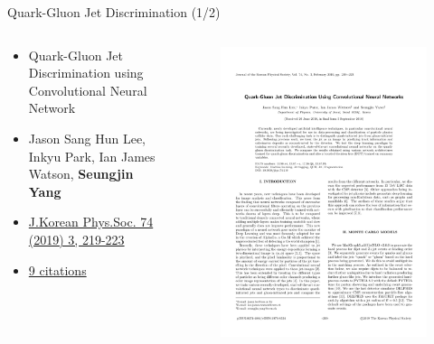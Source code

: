 \makeatletter
  \graphicspath{ {@path} }
\makeatother

\begin{frame}[fragile]{Quark-Gluon Jet Discrimination (1/2)}
  \begin{columns}
    \begin{column}{0.6\textwidth}
      \begin{itemize}
        \item Quark-Gluon Jet Discrimination using Convolutional Neural Network
        \item Jason Sang Hun Lee, Inkyu Park, Ian James Watson, {\bf Seungjin Yang}
        \item \href{https://doi.org/10.3938/jkps.74.219}{J.Korean Phys.Soc. 74 (2019) 3, 219-223}
        \item \href{https://inspirehep.net/literature/1721034}{9 citations}
      \end{itemize}

    \end{column}

    \begin{column}{0.4\textwidth}
      \begin{figure}[htpb]
        \centering
        \includegraphics[width=1.0\textwidth]{fig/publication/JP18-0338_F.pdf}
      \end{figure}
    \end{column}
  \end{columns}
\end{frame}


